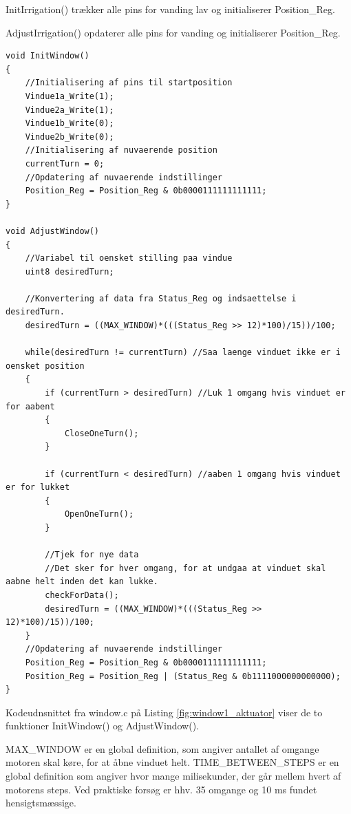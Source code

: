 InitIrrigation() trækker alle pins for vanding lav og initialiserer Position\_Reg.

AdjustIrrigation() opdaterer alle pins for vanding og initialiserer Position\_Reg.

\clearpage

\begin{lstlisting}[caption=Udsnit A af window.c for PSoC4 i Aktuator, label=fig:window1_aktuator]
void InitWindow()
{
    //Initialisering af pins til startposition
    Vindue1a_Write(1);
    Vindue2a_Write(1);
    Vindue1b_Write(0);
    Vindue2b_Write(0);
    //Initialisering af nuvaerende position
    currentTurn = 0;
    //Opdatering af nuvaerende indstillinger
    Position_Reg = Position_Reg & 0b0000111111111111;
}

void AdjustWindow()
{
    //Variabel til oensket stilling paa vindue
    uint8 desiredTurn;
       
    //Konvertering af data fra Status_Reg og indsaettelse i desiredTurn.
    desiredTurn = ((MAX_WINDOW)*(((Status_Reg >> 12)*100)/15))/100;
    
    while(desiredTurn != currentTurn) //Saa laenge vinduet ikke er i oensket position
    {
        if (currentTurn > desiredTurn) //Luk 1 omgang hvis vinduet er for aabent
        {
            CloseOneTurn();
        }
    
        if (currentTurn < desiredTurn) //aaben 1 omgang hvis vinduet er for lukket
        {
            OpenOneTurn();
        }
        
        //Tjek for nye data
        //Det sker for hver omgang, for at undgaa at vinduet skal aabne helt inden det kan lukke.
        checkForData();
        desiredTurn = ((MAX_WINDOW)*(((Status_Reg >> 12)*100)/15))/100;
    }
    //Opdatering af nuvaerende indstillinger
    Position_Reg = Position_Reg & 0b0000111111111111;
    Position_Reg = Position_Reg | (Status_Reg & 0b1111000000000000);
}
\end{lstlisting}

\clearpage

Kodeudnsnittet fra window.c på Listing \ref{fig:window1_aktuator} viser de to funktioner InitWindow() og AdjustWindow().

MAX\_WINDOW er en global definition, som angiver antallet af omgange motoren skal køre, for at åbne vinduet helt. 
TIME\_BETWEEN\_STEPS er en global definition som angiver hvor mange milisekunder, der går mellem hvert af motorens steps. 
Ved praktiske forsøg er hhv. 35 omgange og 10 ms fundet hensigtsmæssige.

